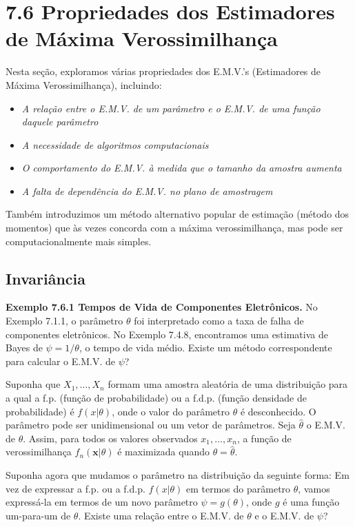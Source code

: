 \section*{7.6 Propriedades dos Estimadores de Máxima Verossimilhança}

Nesta seção, exploramos várias propriedades dos E.M.V.'s (Estimadores de Máxima Verossimilhança), incluindo:
\begin{itemize}
    \item \textit{A relação entre o E.M.V. de um parâmetro e o E.M.V. de uma função daquele parâmetro}
    \item \textit{A necessidade de algoritmos computacionais}
    \item \textit{O comportamento do E.M.V. à medida que o tamanho da amostra aumenta}
    \item \textit{A falta de dependência do E.M.V. no plano de amostragem}
\end{itemize}

Também introduzimos um método alternativo popular de estimação (método dos momentos) que às vezes concorda com a máxima verossimilhança, mas pode ser computacionalmente mais simples.

\subsection*{Invariância}

\textbf{Exemplo 7.6.1 Tempos de Vida de Componentes Eletrônicos.} No Exemplo 7.1.1, o parâmetro $\theta$ foi interpretado como a taxa de falha de componentes eletrônicos. No Exemplo 7.4.8, encontramos uma estimativa de Bayes de $\psi = 1/\theta$, o tempo de vida médio. Existe um método correspondente para calcular o E.M.V. de $\psi$?

Suponha que $X_1, \dots, X_n$ formam uma amostra aleatória de uma distribuição para a qual a f.p. (função de probabilidade) ou a f.d.p. (função densidade de probabilidade) é $f(x|\theta)$, onde o valor do parâmetro $\theta$ é desconhecido. O parâmetro pode ser unidimensional ou um vetor de parâmetros. Seja $\hat{\theta}$ o E.M.V. de $\theta$. Assim, para todos os valores observados $x_1, \dots, x_n$, a função de verossimilhança $f_n(\mathbf{x}|\theta)$ é maximizada quando $\theta = \hat{\theta}$.

Suponha agora que mudamos o parâmetro na distribuição da seguinte forma: Em vez de expressar a f.p. ou a f.d.p. $f(x|\theta)$ em termos do parâmetro $\theta$, vamos expressá-la em termos de um novo parâmetro $\psi = g(\theta)$, onde $g$ é uma função um-para-um de $\theta$. Existe uma relação entre o E.M.V. de $\theta$ e o E.M.V. de $\psi$?

